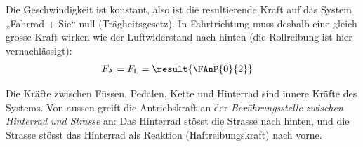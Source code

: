 \begin{center}
\end{center}

Die Geschwindigkeit ist konstant, also ist die resultierende Kraft auf das System „Fahrrad + Sie“ null (Trägheitsgesetz). In Fahrtrichtung muss deshalb eine gleich grosse Kraft wirken wie der Luftwiderstand nach hinten (die Rollreibung ist hier vernachlässigt):
\begin{align}
 F_\text{A} &= F_\text{L} = \result{\FAnP{0}{2}}
\end{align}

Die Kräfte zwischen Füssen, Pedalen, Kette und Hinterrad sind innere Kräfte des Systems. Von aussen greift die Antriebskraft an der \emph{Berührungsstelle zwischen Hinterrad und Strasse} an: Das Hinterrad stösst die Strasse nach hinten, und die Strasse stösst das Hinterrad als Reaktion (Haftreibungskraft) nach vorne.
